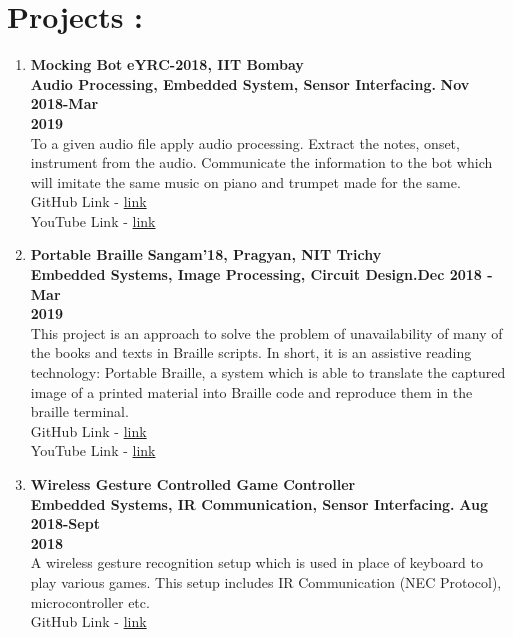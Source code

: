 \documentclass[a4paper, 12 pt]{article}
\begin{document}
\section*{Projects :}
\begin{enumerate}
\item {\Large \textbf{Mocking Bot}}{ \hfill {\bf eYRC-2018, IIT Bombay}}\\
{\bf Audio Processing, Embedded System, Sensor Interfacing.} \hfill{\bf Nov 2018-Mar} \\ \hfill {\bf 2019}\\
To a given audio file apply audio processing. Extract the notes, onset, instrument from the audio. Communicate the information to the bot which will imitate the same music on piano and trumpet made for the same.\\
GitHub Link - \href{https://github.com/Rajk0520/Mocking-Bot-MB-}{link}\\
YouTube Link - \href{https://youtu.be/scbUX3qAjQ8}{link}
\item {\Large \textbf{Portable Braille}}{ \hfill {\bf Sangam'18, Pragyan, NIT Trichy}}\\
{\bf Embedded Systems, Image Processing, Circuit Design.}\hfill{\bf Dec 2018 - Mar} \\ \hfill {\bf 2019}\\
This project is an approach to solve the problem of unavailability of many of the books and texts in Braille scripts. In short, it is an assistive reading technology: Portable Braille, a system which is able to translate the captured image of a printed material into Braille code and reproduce them in the braille terminal.\\
GitHub Link - \href{https://github.com/Rajk0520/Portable_Braille}{link}\\
YouTube Link - \href{https://youtu.be/wZ1dMdXMtPE}{link}
\item {\Large \textbf{Wireless Gesture Controlled Game Controller }}\\
{\bf Embedded Systems, IR Communication, Sensor Interfacing.} \hfill {\bf Aug 2018-Sept}\\ \hfill {\bf 2018}\\
A wireless gesture recognition setup which is used in place of keyboard to play various games. This setup includes IR Communication (NEC Protocol), microcontroller etc.\\
GitHub Link - \href{https://github.com/Rajk0520/u_CON-WrkShop-2018}{link}
\end{enumerate}
\end{document}
